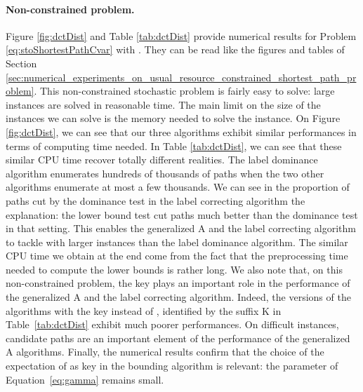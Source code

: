 \documentclass[11pt]{amsart}
\theoremstyle{plain}
\theoremstyle{remark}
\begin{document}
\paragraph{Non-constrained problem.} 
Figure \ref{fig:dctDist} and Table \ref{tab:dctDist} provide numerical results for Problem \eqref{eq:stoShortestPathCvar} with . They can be read like the figures and tables of Section \ref{sec:numerical_experiments_on_usual_resource_constrained_shortest_path_problem}. This non-constrained stochastic problem is fairly easy to solve: large instances are solved in reasonable time. The main limit on the size of the instances we can solve is the memory needed to solve the instance. On Figure \ref{fig:dctDist}, we can see that our three algorithms exhibit similar performances in terms of computing time needed. In Table \ref{tab:dctDist}, we can see that these similar CPU time recover totally different realities. The label dominance algorithm enumerates hundreds of thousands of paths when the two other algorithms enumerate at most a few thousands. We can see in the proportion of paths cut by the dominance test in the label correcting algorithm the explanation: the lower bound test cut paths much better than the dominance test in that setting. This enables the generalized A and the label correcting algorithm to tackle with larger instances than the label dominance algorithm. The similar CPU time we obtain at the end come from the fact that the preprocessing time needed to compute the lower bounds is rather long. We also note that, on this non-constrained problem, the key plays an important role in the performance of the generalized A and the label correcting algorithm. Indeed, the versions of the algorithms with the key  instead of , identified by the suffix K in Table~\ref{tab:dctDist} exhibit much poorer performances. On difficult instances, candidate paths are an important element of the performance of the generalized A algorithms. Finally, the numerical results confirm that the choice of the expectation of  as key in the bounding algorithm is relevant: the parameter  of Equation~\eqref{eq:gamma} remains small.
\end{document}
